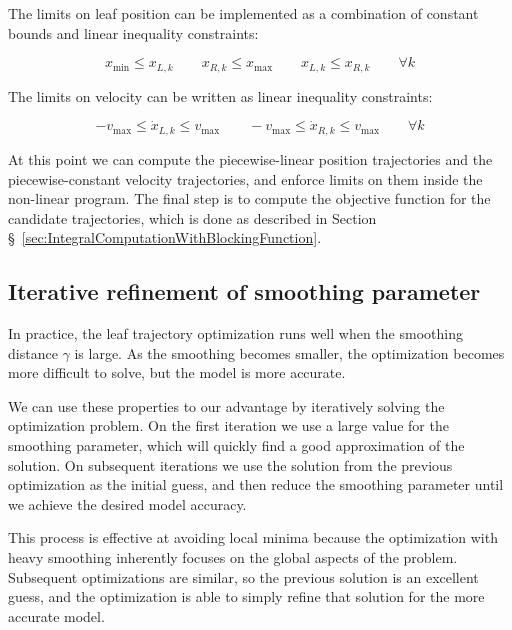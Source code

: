 \documentclass[12pt]{article}
\begin{document}
The limits on leaf position can be implemented as a combination of
constant bounds and linear inequality constraints:

\begin{equation}
  x_\text{min} \leq x_{L, k}
  \quad \quad
  x_{R, k} \leq x_\text{max}
  \quad \quad
  x_{L, k} \leq x_{R, k}
  \quad \quad
  \forall k
  \label{eqn:PositionLimits}
\end{equation}

The limits on velocity can be written as linear inequality constraints:

\begin{equation}
  -v_\text{max} \leq \dot{x}_{L, k} \leq v_\text{max}
  \quad \quad
  -v_\text{max} \leq \dot{x}_{R, k} \leq v_\text{max}
  \quad \quad \forall k
  \label{eqn:VelocityLimits}
\end{equation}

At this point we can compute the piecewise-linear position trajectories and the
piecewise-constant velocity trajectories, and enforce limits on them inside the non-linear program.
The final step is to compute the objective function for the candidate trajectories,
which is done as described in Section \S~\ref{sec:IntegralComputationWithBlockingFunction}.

\subsection{Iterative refinement of smoothing parameter}

In practice, the leaf trajectory optimization runs well 
when the smoothing distance $\gamma$ is large.
As the smoothing becomes smaller, the optimization becomes more difficult to solve,
but the model is more accurate.

We can use these properties to our advantage by iteratively solving the optimization problem.
On the first iteration we use a large value for the smoothing parameter,
which will quickly find a good approximation of the solution.
On subsequent iterations we use the solution from the previous optimization as the initial guess,
and then reduce the smoothing parameter until we achieve the desired model accuracy.

This process is effective at avoiding local minima because
the optimization with heavy smoothing inherently focuses on the global aspects of the problem.
Subsequent optimizations are similar, so the previous solution is an excellent guess,
and the optimization is able to simply refine that solution for the more accurate model.
\end{document}

